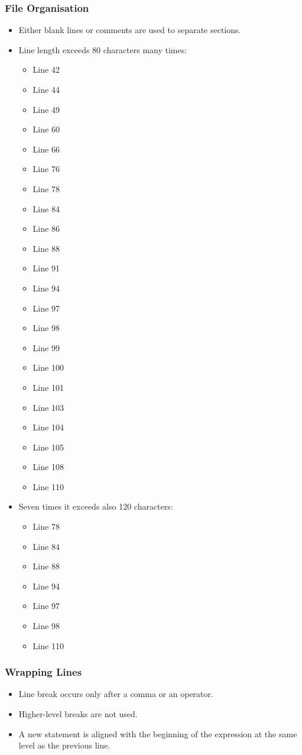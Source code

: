 \subsubsection{File Organisation}
\begin{itemize}
\item Either blank lines or comments are used to separate sections.
\item Line length exceeds 80 characters many times:
\begin{itemize}
\item Line 42 
\item Line 44 
\item Line 49 
\item Line 60 
\item Line 66 
\item Line 76 
\item Line 78 
\item Line 84 
\item Line 86 
\item Line 88 
\item Line 91 
\item Line 94 
\item Line 97 
\item Line 98 
\item Line 99 
\item Line 100
\item Line 101
\item Line 103
\item Line 104
\item Line 105
\item Line 108
\item Line 110
\end{itemize} 
\item Seven times it exceeds also 120 characters: 
\begin{itemize}
\item Line 78
\item Line 84
\item Line 88
\item Line 94
\item Line 97
\item Line 98
\item Line 110
\end{itemize}
\end{itemize}

\subsubsection{Wrapping Lines}
\begin{itemize}
\item Line break occurs only after a comma or an operator. 
\item Higher-level breaks are not used. 
\item A new statement is aligned with the beginning of the expression at the
same level as the previous line.
\end{itemize}


